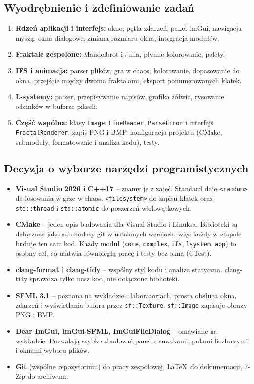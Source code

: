\documentclass[11pt,a4paper]{article}
\newcommand{\kod}[1]{\texttt{#1}}
\begin{document}
\subsection{Wyodrębnienie i zdefiniowanie zadań}

\begin{enumerate}
  \item \textbf{Rdzeń aplikacji i interfejs:} okno, pętla zdarzeń, panel ImGui,
        nawigacja myszą, okna dialogowe, zmiana rozmiaru okna, integracja
        modułów.
  \item \textbf{Fraktale zespolone:} Mandelbrot i Julia, płynne kolorowanie,
        palety.
  \item \textbf{IFS i animacja:} parser plików, gra w chaos, kolorowanie,
        dopasowanie do okna, przejście między dwoma fraktalami, eksport
        ponumerowanych klatek.
  \item \textbf{L-systemy:} parser, przepisywanie napisów, grafika żółwia,
        rysowanie odcinków w buforze pikseli.
  \item \textbf{Część wspólna:} klasy \kod{Image}, \kod{LineReader},
        \kod{ParseError} i interfejs \kod{FractalRenderer}, zapis PNG i BMP,
        konfiguracja projektu (CMake, submoduły, formatowanie i analiza kodu),
        testy.
\end{enumerate}

\subsection{Decyzja o wyborze narzędzi programistycznych}

\begin{itemize}
  \item \textbf{Visual Studio 2026 i C++17} -- znamy je z zajęć. Standard
        daje \kod{<random>} do losowania w grze w chaos, \kod{<filesystem>} do
        zapisu klatek oraz \kod{std::thread} i \kod{std::atomic} do poszerzeń
        wielowątkowych.
  \item \textbf{CMake} -- jeden opis budowania dla Visual Studio i Linuksa.
        Biblioteki są dołączone jako submoduły git w ustalonych wersjach, więc
        każdy w zespole buduje ten sam kod. Każdy moduł (\kod{core},
        \kod{complex}, \kod{ifs}, \kod{lsystem}, \kod{app}) to osobny cel,
        co ułatwia równoległą pracę i testy bez okna (CTest).
  \item \textbf{clang-format i clang-tidy} -- wspólny styl kodu
        i analiza statyczna. clang-tidy sprawdza tylko nasz kod, nie
        dołączone biblioteki.
  \item \textbf{SFML 3.1} -- poznana na wykładzie i laboratoriach, prosta
        obsługa okna, zdarzeń i wyświetlania bufora przez \kod{sf::Texture}.
        \kod{sf::Image} zapisuje obrazy PNG i BMP.
  \item \textbf{Dear ImGui, ImGui-SFML, ImGuiFileDialog} -- omawiane na
        wykładzie. Pozwalają szybko zbudować panel z suwakami, polami liczbowymi
        i oknami wyboru plików.
  \item \textbf{Git} (wspólne repozytorium) do pracy zespołowej, \LaTeX\ do
        dokumentacji, 7-Zip do archiwum.
\end{itemize}
\end{document}
